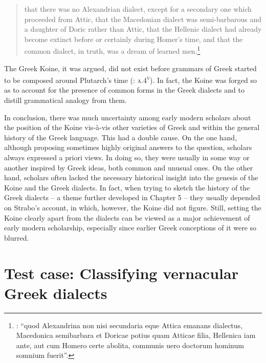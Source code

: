 \begin{quote}
that there was no Alexandrian dialect, except for a secondary one which proceeded from Attic, that the Macedonian dialect was semi-barbarous and a daughter of Doric rather than Attic, that the Hellenic dialect had already become extinct before or certainly during Homer’s time, and that the common dialect, in truth, was a dream of learned men.\footnote{\citet[\textsc{c.2}\textsc{\textsuperscript{v}}]{Kirchmaier1709}: “quod Alexandrina non nisi secundaria eque Attica emanans dialectus, Macedonica semibarbara et Doricae potius quam Atticae filia, Hellenica iam ante, aut cum Homero certe abolita, communis uero doctorum hominum somnium fuerit”.}
\end{quote}

The Greek Koine, it was argued, did not exist before grammars of Greek started to be composed around Plutarch’s time (\citealt{Kirchmaier1709}: \textsc{a.4}\textsc{\textsuperscript{v}}). In fact, the Koine was forged so as to account for the presence of common forms in the Greek dialects and to distill grammatical analogy from them.

In conclusion, there was much uncertainty among early modern scholars about the position of the Koine vis-à-vis other varieties of Greek and within the general history of the Greek language. This had a double cause. On the one hand, although proposing sometimes highly original answers to the question, scholars always expressed a priori views. In doing so, they were usually in some way or another inspired by Greek ideas, both common and unusual ones. On the other hand, scholars often lacked the necessary historical insight into the genesis of the Koine and the Greek dialects. In fact, when trying to sketch the history of the Greek dialects – a theme further developed in Chapter 5 – they usually depended on Strabo’s account, in which, however, the Koine did not figure. Still, setting the Koine clearly apart from the dialects can be viewed as a major achievement of early modern scholarship, especially since earlier Greek conceptions of it were so blurred.

\section{Test case: Classifying vernacular Greek dialects}\label{sec:2.10}

